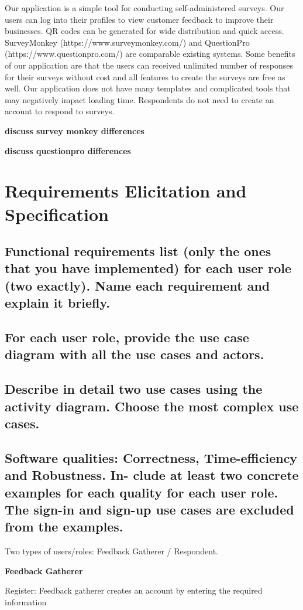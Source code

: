 \documentclass[letterpaper, 12 pt, conference]{ieeeconf}
\begin{document}
Our application is a simple tool for conducting self-administered surveys. Our users can log into their profiles to view customer feedback to improve their businesses. QR codes can be generated for wide distribution and quick access. SurveyMonkey (https://www.surveymonkey.com/) and QuestionPro (https://www.questionpro.com/) are comparable existing systems. Some benefits of our application are that the users can received unlimited number of responses for their surveys without cost and all features to create the surveys are free as well. Our application does not have many templates and complicated tools that may negatively impact loading time. Respondents do not need to create an account to respond to surveys. 

\textbf{discuss survey monkey differences}

\textbf{discuss questionpro differences}


\newpage
\section{Requirements Elicitation and Specification}
\subsection{Functional requirements list (only the ones that you have implemented) for each user role (two exactly). Name each requirement and explain it briefly.}
\subsection{For each user role, provide the use case diagram with all the use cases and actors.}
\subsection{Describe in detail two use cases using the activity diagram. Choose the most complex use cases.}
\subsection{Software qualities: Correctness, Time-eﬀiciency and Robustness. In- clude at least two concrete examples for each quality for each user role. The sign-in and sign-up use cases are excluded from the examples.
}

Two types of users/roles: Feedback Gatherer / Respondent.

\textbf{Feedback Gatherer}
    
    Register: Feedback gatherer creates an account by entering the required information
    
\end{document}
